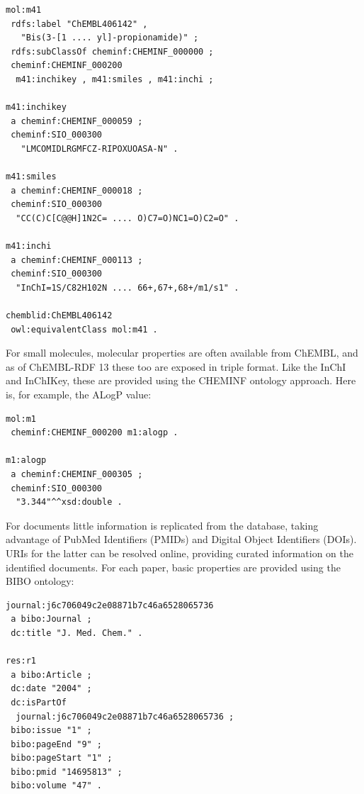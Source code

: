 \documentclass[10pt]{bmc_article}
\newenvironment{bmcformat}{\begin{raggedright}\baselineskip20pt\sloppy\setboolean{publ}{false}}{\end{raggedright}\baselineskip20pt\sloppy}
\begin{document}
\begin{bmcformat}
\begin{small}
\begin{verbatim}
mol:m41
 rdfs:label "ChEMBL406142" , 
   "Bis(3-[1 .... yl]-propionamide)" ;
 rdfs:subClassOf cheminf:CHEMINF_000000 ;
 cheminf:CHEMINF_000200
  m41:inchikey , m41:smiles , m41:inchi ;

m41:inchikey
 a cheminf:CHEMINF_000059 ;
 cheminf:SIO_000300
   "LMCOMIDLRGMFCZ-RIPOXUOASA-N" .

m41:smiles
 a cheminf:CHEMINF_000018 ;
 cheminf:SIO_000300
  "CC(C)C[C@@H]1N2C= .... O)C7=O)NC1=O)C2=O" .

m41:inchi
 a cheminf:CHEMINF_000113 ;
 cheminf:SIO_000300
  "InChI=1S/C82H102N .... 66+,67+,68+/m1/s1" .

chemblid:ChEMBL406142
 owl:equivalentClass mol:m41 .
\end{verbatim}
\end{small}

For small molecules, molecular properties are often available from ChEMBL, and as of ChEMBL-RDF 13
these too are exposed in triple format. Like the InChI and InChIKey, these are provided using the
CHEMINF ontology approach. Here is, for example, the ALogP value:

\begin{small}
\begin{verbatim}
mol:m1
 cheminf:CHEMINF_000200 m1:alogp .

m1:alogp
 a cheminf:CHEMINF_000305 ;
 cheminf:SIO_000300
  "3.344"^^xsd:double .
\end{verbatim}
\end{small}

For documents little information is replicated from the database, taking advantage
of PubMed Identifiers (PMIDs) and Digital Object Identifiers (DOIs). URIs for the
latter can be resolved online, providing curated information on the identified
documents. For each paper, basic properties are provided using the BIBO
ontology:

\begin{small}
\begin{verbatim}
journal:j6c706049c2e08871b7c46a6528065736
 a bibo:Journal ;
 dc:title "J. Med. Chem." .

res:r1
 a bibo:Article ;
 dc:date "2004" ;
 dc:isPartOf
  journal:j6c706049c2e08871b7c46a6528065736 ;
 bibo:issue "1" ;
 bibo:pageEnd "9" ;
 bibo:pageStart "1" ;
 bibo:pmid "14695813" ;
 bibo:volume "47" .
\end{verbatim}
\end{small}


\end{bmcformat}
\end{document}
